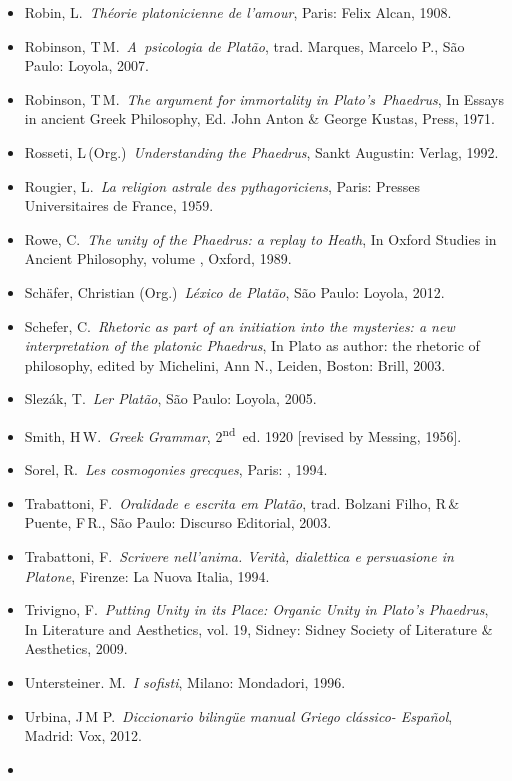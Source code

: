 \begin{itemize}
\item
  Robin, L.~\emph{Théorie platonicienne de l'amour}, Paris: Felix Alcan,
  1908.
\item
  Robinson, T\,M.~\emph{A~psicologia de Platão}, trad. Marques, Marcelo
  P., São Paulo: Loyola, 2007.
\item
  Robinson, T\,M.~\emph{The argument for immortality in
  Plato's}~\emph{Phaedrus}, In Essays in ancient Greek Philosophy, Ed.
  John Anton \& George Kustas,  Press, 1971.
\item
  Rosseti, L\,(Org.)~\emph{Understanding the Phaedrus}, Sankt Augustin:
  Verlag, 1992.
\item
  Rougier, L.~\emph{La religion astrale des pythagoriciens}, Paris:
  Presses Universitaires de France, 1959.
\item
  Rowe, C.~\emph{The unity of the Phaedrus: a replay to Heath}, In
  Oxford Studies in Ancient Philosophy, volume , Oxford, 1989.
\item
  Schäfer, Christian (Org.)~\emph{Léxico de Platão}, São Paulo: Loyola,
  2012.
\item
  Schefer, C.~\emph{Rhetoric as part of an initiation into the
  mysteries: a new interpretation of the platonic Phaedrus}, In Plato as
  author: the rhetoric of philosophy, edited by Michelini, Ann N.,
  Leiden, Boston: Brill, 2003.
\item
  Slezák, T.~\emph{Ler Platão}, São Paulo: Loyola, 2005.
\item
  Smith, H\,W.~\emph{Greek Grammar}, 2\textsuperscript{nd}~ed. 1920
  [revised by Messing, 1956].
\item
  Sorel, R.~\emph{Les cosmogonies grecques}, Paris: , 1994.
\item
  Trabattoni, F.~\emph{Oralidade e escrita em Platão}, trad. Bolzani
  Filho, R\,\& Puente, F\,R., São Paulo: Discurso Editorial, 2003.
\item
  Trabattoni, F.~\emph{Scrivere nell'anima. Verità, dialettica e
  persuasione in Platone}, Firenze: La Nuova Italia, 1994.
\item
  Trivigno, F.~\emph{Putting Unity in its Place: Organic Unity in
  Plato's Phaedrus}, In Literature and Aesthetics, vol. 19, Sidney:
  Sidney Society of Literature \& Aesthetics, 2009.
\item
  Untersteiner. M.~\emph{I sofisti}, Milano: Mondadori, 1996.
\item
  Urbina, J\,M P.~\emph{Diccionario bilingüe manual Griego clássico-
  Español}, Madrid: Vox, 2012.
\item

\end{itemize}
